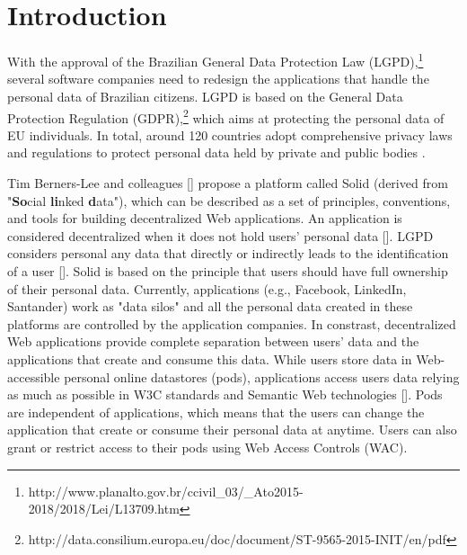 \documentclass[sigconf]{acmart}
\begin{document}

%

%
\maketitle

\section{Introduction}

With the approval of the Brazilian General Data Protection Law (LGPD),\footnote{http://www.planalto.gov.br/ccivil\_03/\_Ato2015-2018/2018/Lei/L13709.htm} several software companies need to redesign the applications that handle the personal data of Brazilian citizens. LGPD is based on the General Data Protection Regulation (GDPR),\footnote{http://data.consilium.europa.eu/doc/document/ST-9565-2015-INIT/en/pdf} which aims at protecting the personal data of EU individuals. In total, around 120 countries adopt comprehensive privacy laws and regulations to protect personal data held by private and public bodies \cite{Banisar2011}.

Tim Berners-Lee and colleagues [] propose a platform called Solid (derived from "\textbf{So}cial \textbf{li}nked \textbf{d}ata"), which can be described as a set of principles, conventions, and tools for building decentralized Web applications. An application is considered decentralized when it does not hold users' personal data []. LGPD considers personal any data that directly or indirectly leads to the identification of a user []. Solid is based on the principle that users should have full ownership of their personal data. Currently, applications (e.g., Facebook, LinkedIn, Santander) work as "data silos" and all the personal data created in these platforms are controlled by the application companies. In constrast, decentralized Web applications provide complete separation between users' data and the applications that create and consume this data. While users store data in Web-accessible personal online datastores (pods), applications access users data relying as much as possible in W3C standards and Semantic Web technologies []. Pods are independent of applications, which means that the users can change the application that create or consume their personal data at anytime. Users can also grant or restrict access to their pods using Web Access Controls (WAC).
\end{document}
